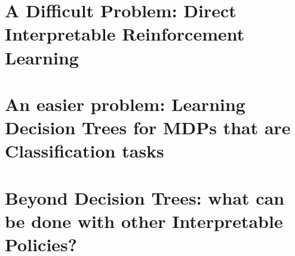 \documentclass[11pt,space=onehalf,version=final]{yathesis}
\begin{document}
\part{A Difficult Problem: Direct Interpretable Reinforcement Learning}
% 

%

%

%
%
\part{An easier problem: Learning Decision Trees for MDPs that are Classification tasks}
%

%

%



\part{Beyond Decision Trees: what can be done with other Interpretable Policies?}





%
%
%
%

%
\printbibliography
%
\appendix
%


%
\backmatter
%
%
%
\tableofcontents
%
%
\end{document}
